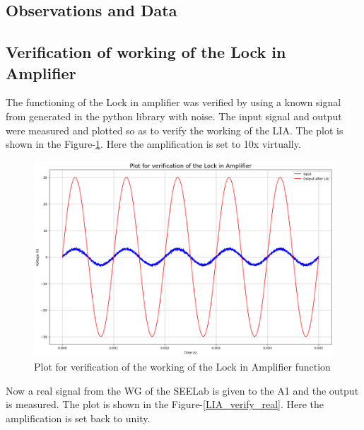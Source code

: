 \documentclass{article}
\begin{document}
\begin{multicols}{2}
\section{Observations and Data}

\subsection{Verification of working of the Lock in Amplifier}

The functioning of the Lock in amplifier was verified by using a known signal from generated in the python library with noise. The input signal and output were measured and plotted so as to verify the working of the LIA. The plot is shown in the Figure-\ref{LIA_verify}. Here the amplification is set to 10x virtually.

\begin{figure}[H]
    \centering
    \includegraphics[width=\columnwidth]{Images/LIA_verify.png}
    \caption{Plot for verification of the working of the Lock in Amplifier function}
    \label{LIA_verify}
\end{figure}


Now a real signal from the WG of the SEELab is given to the A1 and the output is measured. The plot is shown in the Figure-\ref{LIA_verify_real}. Here the amplification is set back to unity.



\end{multicols}
\end{document}
